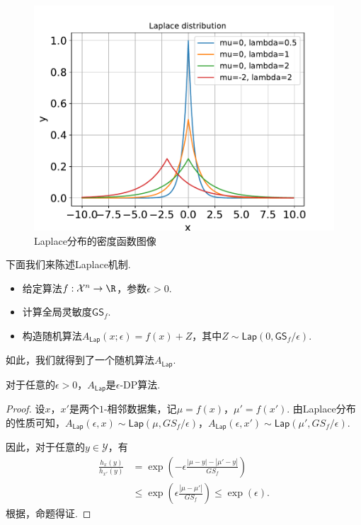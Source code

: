 \begin{figure}[ht]
    \centering
    \includegraphics[scale=0.6]{Figures/differential-privacy/LaplaceDist.pdf}
    
    \caption{Laplace分布的密度函数图像}
    \label{fig:Laplace-distribution}
\end{figure}

下面我们来陈述Laplace机制.

\begin{itemize}
    \item 给定算法$f:\mathcal X^n \to \R$，参数$\epsilon>0$.
    \item 计算全局灵敏度$\mathsf{GS}_f$.
    \item 构造随机算法$A_{\mathsf{Lap}}(x;\epsilon) = f(x) + Z$，其中$Z\sim \mathsf{Lap}(0, \mathsf{GS}_f/\epsilon)$.
\end{itemize}
如此，我们就得到了一个随机算法$A_{\mathsf{Lap}}$. 

\begin{theorem}\label{thm:laplace-mechanism}
    对于任意的$\epsilon > 0$，$A_{\mathsf{Lap}}$是$\epsilon$-DP算法.
\end{theorem}
\begin{proof}
设$x$，$x'$是两个$1$-相邻数据集，记$\mu = f(x)$，$\mu' = f(x')$. 由Laplace分布的性质可知，$A_{\mathsf{Lap}}(\epsilon, x) \sim \mathsf{Lap}(\mu, GS_f/\epsilon)$，$A_{\mathsf{Lap}}(\epsilon, x') \sim \mathsf{Lap}(\mu', GS_f/\epsilon)$.

因此，对于任意的$y \in \mathcal Y$，有
    \[
    \begin{aligned}
        \frac{h_{x}(y)}{h_{x'}(y)} &=\exp \left(-\epsilon \frac{|\mu - y| - |\mu' - y|}{GS_f} \right) \\
        &\leq \exp \left(\epsilon \frac{|\mu - \mu'|}{GS_f} \right)\leq \exp(\epsilon).
    \end{aligned}
    \]
根据，命题得证. 
\end{proof}

